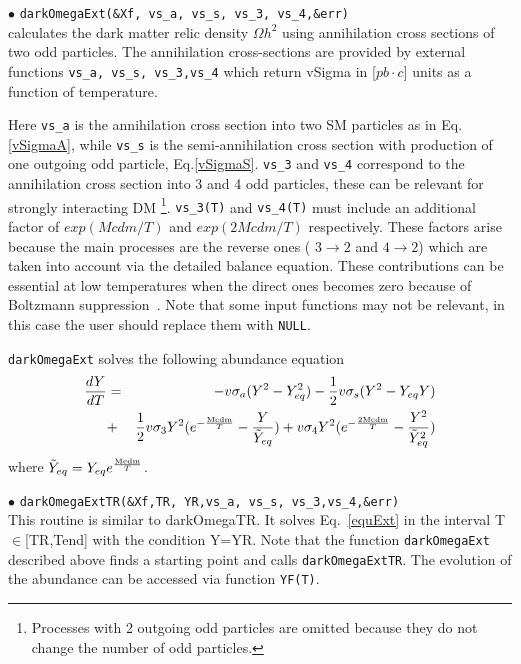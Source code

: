 \documentclass[12pt,a4paper]{article}
\begin{document}
\noindent
$\bullet$ \verb|darkOmegaExt(&Xf, vs_a, vs_s, vs_3, vs_4,&err)|\\
calculates the dark matter relic density $\Omega h^2$  
using annihilation cross sections of two odd particles. The annihilation cross-sections are provided by external 
functions  {\tt vs\_a, vs\_s, vs\_3,vs\_4}  
which return vSigma in [$pb\cdot c$] units as a function of temperature. 

Here  \verb|vs_a|  is the  annihilation cross section  
into two SM particles  as in Eq.\ref{vSigmaA},  while  \verb|vs_s| is the
semi-annihilation cross section   with production of 
one outgoing odd particle, Eq.\ref{vSigmaS}. {\tt vs\_3} and {\tt vs\_4} correspond to the
annihilation cross section  into  3 and 4 odd particles, these
 can be relevant for  strongly interacting DM
\footnote{ Processes with 2 outgoing odd particles  are omitted because they do not change the number of odd particles.}. {\tt vs\_3(T)} and {\tt vs\_4(T)}  must  include an additional
factor of $ exp(Mcdm/T)$ and $ exp(2Mcdm/T)$ respectively. These factors arise because the main processes are  the reverse ones ( $3\to2$ and $4\to2$) which are taken into account via the detailed balance equation. These contributions can be essential at low temperatures when the direct ones becomes zero because of Boltzmann suppression~\cite{Belanger:2026ctm}.
 Note that some input functions may not be relevant, in this case  the
user should replace them with  {\tt NULL}. 
 

\verb|darkOmegaExt| solves the following abundance equation
\begin{eqnarray}
\nonumber
 \frac{dY}{dT}&=&  - v\sigma_a(Y^2-Y_{eq}^2)
        -\frac{1}{2} v\sigma_s (Y^2-Y_{eq}Y)\\
\label{equExt}
        &+&\frac{1}{2} v\sigma_3 Y^2( e^{-\frac{{\rm Mcdm}}{T}}-\frac{Y}{\tilde{Y}_{eq}})
        +    v\sigma_4Y^2( e^{-\frac{2{\rm Mcdm}}{T}}-\frac{Y^2}{\tilde{Y}_{eq}^2})
\end{eqnarray}
where $\tilde{Y}_{eq}=Y_{eq}e^{\frac{{\rm Mcdm}}{T}}$.  

\noindent
$\bullet$ \verb|darkOmegaExtTR(&Xf,TR, YR,vs_a, vs_s, vs_3,vs_4,&err)|\\
This routine is similar to darkOmegaTR. It solves Eq.~\ref{equExt} in the interval T$\in$[TR,Tend]  with the  condition Y=YR. Note that the function  {\tt darkOmegaExt}
described  above finds a starting point and calls {\tt darkOmegaExtTR}. The evolution of  the abundance can be accessed via function {\tt YF(T)}.     
\end{document}
